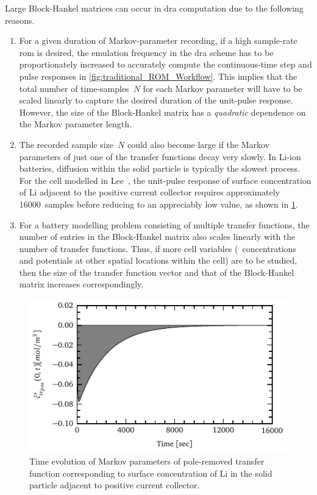 Large Block-Hankel matrices can occur in \gls{dra} computation due to the
following reasons.
\begin{enumerate}
    \item
        For  a  given   duration  of  Markov-parameter  recording,   if  a  high
        sample-rate   \gls{rom}  is   desired,   the   emulation  frequency   in
        the   \gls{dra}  scheme   has   to  be   proportionately  increased   to
        accurately  compute  the continuous-time  step  and  pulse responses  in
        \cref{fig:traditional_ROM_Workflow}. This implies  that the total number
        of time-samples~$N$  for each  Markov parameter will  have to  be scaled
        linearly to  capture the  desired duration  of the  unit-pulse response.
        However,  the size  of the  Block-Hankel matrix  has a  \emph{quadratic}
        dependence on the Markov parameter length.
    \item
        The  recorded sample  size~$N$ could  also  become large  if the  Markov
        parameters of just  one of the transfer functions decay  very slowly. In
        Li-ion batteries, diffusion  within the solid particle  is typically the
        slowest process.  For the cell  modelled in Lee~\etal{},  the unit-pulse
        response of surface concentration of Li adjacent to the positive current
        collector  requires approximately  16000~samples before  reducing to  an
        appreciably low value, as shown in \cref{fig:markov_cse_pos}.
    \item
        For  a  battery  modelling   problem  consisting  of  multiple  transfer
        functions,  the  number  of  entries in  the  Block-Hankel  matrix  also
        scales linearly  with the  number of transfer  functions. Thus,  if more
        cell  variables (\eg~concentrations and  potentials at  other spatial
        locations  within the  cell) are  to be  studied, then  the size  of the
        transfer function vector  and that of the  Block-Hankel matrix increases
        correspondingly.
\end{enumerate}

\begin{figure}[!htbp]
    \centering
    \includegraphics{markov_decay.pdf}
    \caption[Markov parameters of solid surface concentration at positive
    current collector]{Time evolution of Markov parameters of pole-removed transfer
        function corresponding to surface concentration of Li in the solid particle
    adjacent to positive current collector.}
    \label{fig:markov_cse_pos}
\end{figure}


